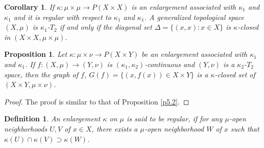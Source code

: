\documentclass{matua}
\newtheorem{corollary}[theorem]{Corollary}
\newtheorem{definition}[theorem]{Definition}
\newtheorem{proposition}[theorem]{Proposition}
\begin{document}
\begin{corollary}
 If $\kappa:\mu\times \mu\rightarrow P(X\times X)$ is an enlargement associated with $\kappa_1$ and $\kappa_1$ and it is regular with respect to $\kappa_1$ and $\kappa_1$. A generalized topological space $(X, \mu)$ is $\kappa_1$-$T_2$ if and only if the diagonal set $\Delta=\{(x, x): x\in X\}$ is $\kappa$-closed in $(X\times X, \mu\times \mu)$.
\end{corollary}
\begin{proposition}
Let $\kappa:\mu\times \nu\rightarrow P(X\times Y)$ be an enlargement associated  with $\kappa_1$ and $\kappa_1$. If $f:(X, \mu)\rightarrow (Y, \nu)$ is $(\kappa_1, \kappa_2)$-continuous and $(Y, \nu)$ is a $\kappa_2$-$T_2$ space, then the graph of $f$, $G(f) = \{(x, f(x))\in X\times Y\}$ is a $\kappa$-closed set of $(X\times Y, \mu\times \nu)$.
\end{proposition}
\begin{proof}
The proof is similar to that of Proposition \ref{p5.2}.
\end{proof}
\begin{definition}
An enlargement $\kappa$ on $\mu$ is said to be regular, if for any $\mu$-open neighborhoods $U, V$ of $x\in X$, there exists a $\mu$-open neighborhood $W$ of $x$ such that $\kappa(U)\cap \kappa(V)\supset \kappa(W)$.
\end{definition}
\end{document}
